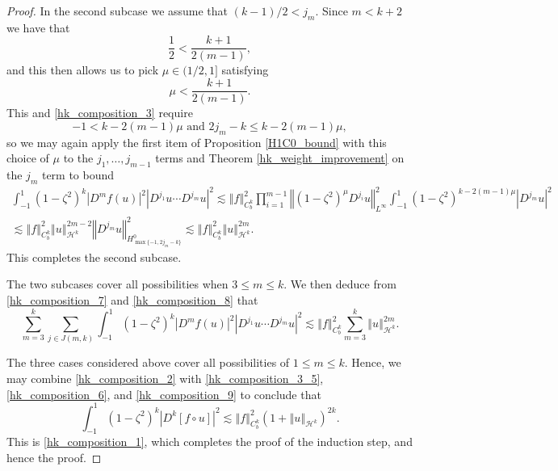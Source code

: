 \documentclass[11pt,reqno]{amsart}
\numberwithin{equation}{section}
\providecommand{\abs}[1]{\left\vert#1\right\vert}
\providecommand{\norm}[1]{\left\Vert#1\right\Vert}
\def\hal{\frac{1}{2}}
\def\ls{\lesssim}
\providecommand{\abs}[1]{\left\vert#1\right\vert}
\providecommand{\norm}[1]{\left\Vert#1\right\Vert}
\def\hal{\frac{1}{2}}
\def\ls{\lesssim}
\def\h{\mathcal{H}}
\begin{document}
\begin{proof}
In the second subcase we assume that $(k-1)/2 < j_m$.  Since $m < k+2$ we have that 
\begin{equation}
\hal < \frac{k+1}{2(m-1)},
\end{equation}
and this then allows us to pick $\mu \in (1/2,1]$ satisfying 
\begin{equation}
 \mu < \frac{k+1}{2(m-1)}.
\end{equation}
This and \eqref{hk_composition_3} require 
\begin{equation}
 -1 < k -2(m-1) \mu \text{ and } 2j_{m} -k \le k - 2(m-1)\mu, 
\end{equation}
so we may again apply the first item of Proposition \ref{H1C0_bound} with this choice of $\mu$ to the $j_1,\dotsc,j_{m-1}$ terms and Theorem \ref{hk_weight_improvement} on the $j_m$ term to bound 
\begin{multline}\label{hk_composition_8}
 \int_{-1}^1 (1-\zeta^2)^k \abs{D^mf(u)}^2 \abs{D^{j_1} u \cdots D^{j_m} u }^2 \ls  \norm{f}_{C^k_b}^2 \prod_{i=1}^{m-1}  \norm{(1-\zeta^2)^{\mu} D^{j_i} u}_{L^\infty}^2  \int_{-1}^1 (1-\zeta^2)^{k-2(m-1)\mu}   \abs{D^{j_{m}} u }^2  \\
  \ls 
\norm{f}_{C^k_b}^2 \norm{u}_{\h^k}^{2m-2}   
  \norm{D^{j_{m}} u}_{H^0_{\max\{-1,2 j_{m} -k\}}}^2  \ls \norm{f}_{C^k_b}^2 \norm{u}_{\h^k}^{2m}.   
\end{multline}
This completes the second subcase.


The two subcases cover all possibilities when $3 \le m\le k$.  We then deduce from \eqref{hk_composition_7} and \eqref{hk_composition_8} that 
\begin{equation}\label{hk_composition_9}
\sum_{m=3}^k \sum_{j \in J(m,k)} \int_{-1}^1 (1-\zeta^2)^k \abs{D^mf(u)}^2 \abs{D^{j_1} u \cdots D^{j_m} u }^2 \ls \norm{f}_{C^k_b}^2 \sum_{m=3}^k \norm{u}_{\h^k}^{2m}.
\end{equation}


The three cases considered above cover all possibilities of $1 \le m \le k$.  Hence, we may combine \eqref{hk_composition_2} with \eqref{hk_composition_3_5}, \eqref{hk_composition_6}, and \eqref{hk_composition_9} to conclude that 
\begin{equation}
  \int_{-1}^1 (1-\zeta^2)^k \abs{ D^k  [ f\circ u ] }^2 \ls \norm{f}_{C^k_b}^2 (1+\norm{u}_{\h^k})^{2k}.
\end{equation}
This is \eqref{hk_composition_1}, which completes the proof of the induction step, and hence the proof.
\end{proof}
\end{document}
